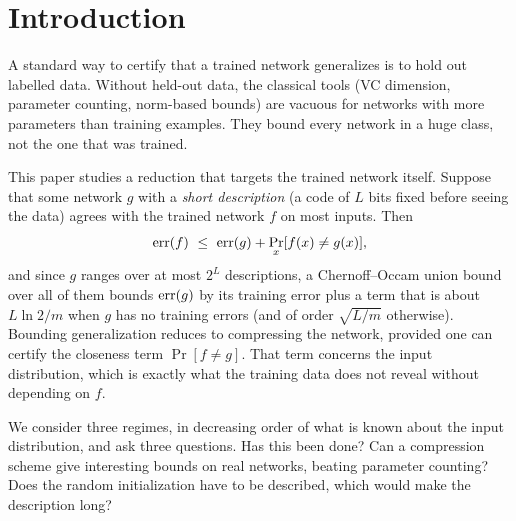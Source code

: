 \section{Introduction}\label{sec:intro}

A standard way to certify that a trained network generalizes is to hold out labelled data. Without held-out data, the classical tools (VC dimension, parameter counting, norm-based bounds) are vacuous for networks with more parameters than training examples. They bound every network in a huge class, not the one that was trained.

This paper studies a reduction that targets the trained network itself. Suppose that some network $g$ with a \emph{short description} (a code of $L$ bits fixed before seeing the data) agrees with the trained network $f$ on most inputs. Then
\[
\err(f)\ \le\ \err(g)+\Pr_x[f(x)\ne g(x)],
\]
and since $g$ ranges over at most $2^L$ descriptions, a Chernoff--Occam union bound over all of them bounds $\mathrm{err}(g)$ by its training error plus a term that is about $L\ln2/m$ when $g$ has no training errors (and of order $\sqrt{L/m}$ otherwise). Bounding generalization reduces to compressing the network, provided one can certify the closeness term $\Pr[f\ne g]$. That term concerns the input distribution, which is exactly what the training data does not reveal without depending on $f$.

We consider three regimes, in decreasing order of what is known about the input distribution, and ask three questions. Has this been done? Can a compression scheme give interesting bounds on real networks, beating parameter counting? Does the random initialization have to be described, which would make the description long?

